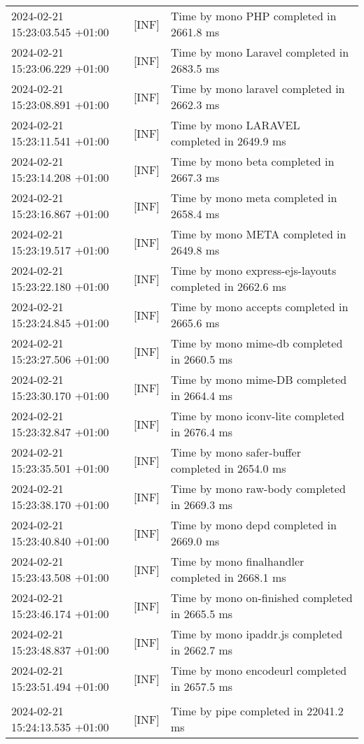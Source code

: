 {{\begin{tabularx}{\textwidth}{|l|l|X|}
                    2024-02-21 15:23:03.545 +01:00 & [INF] & Time by mono PHP completed in 2661.8 ms \\
                    2024-02-21 15:23:06.229 +01:00 & [INF] & Time by mono Laravel completed in 2683.5 ms \\
                    2024-02-21 15:23:08.891 +01:00 & [INF] & Time by mono laravel completed in 2662.3 ms \\
                    2024-02-21 15:23:11.541 +01:00 & [INF] & Time by mono LARAVEL completed in 2649.9 ms \\
                    2024-02-21 15:23:14.208 +01:00 & [INF] & Time by mono beta completed in 2667.3 ms \\
                    2024-02-21 15:23:16.867 +01:00 & [INF] & Time by mono meta completed in 2658.4 ms \\
                    2024-02-21 15:23:19.517 +01:00 & [INF] & Time by mono META completed in 2649.8 ms \\
                    2024-02-21 15:23:22.180 +01:00 & [INF] & Time by mono express-ejs-layouts completed in 2662.6 ms \\
                    2024-02-21 15:23:24.845 +01:00 & [INF] & Time by mono accepts completed in 2665.6 ms \\
                    2024-02-21 15:23:27.506 +01:00 & [INF] & Time by mono mime-db completed in 2660.5 ms \\
                    2024-02-21 15:23:30.170 +01:00 & [INF] & Time by mono mime-DB completed in 2664.4 ms \\
                    2024-02-21 15:23:32.847 +01:00 & [INF] & Time by mono iconv-lite completed in 2676.4 ms \\
                    2024-02-21 15:23:35.501 +01:00 & [INF] & Time by mono safer-buffer completed in 2654.0 ms \\
                    2024-02-21 15:23:38.170 +01:00 & [INF] & Time by mono raw-body completed in 2669.3 ms \\
                    2024-02-21 15:23:40.840 +01:00 & [INF] & Time by mono depd completed in 2669.0 ms \\
                    2024-02-21 15:23:43.508 +01:00 & [INF] & Time by mono finalhandler completed in 2668.1 ms \\
                    2024-02-21 15:23:46.174 +01:00 & [INF] & Time by mono on-finished completed in 2665.5 ms \\
                    2024-02-21 15:23:48.837 +01:00 & [INF] & Time by mono ipaddr.js completed in 2662.7 ms \\
                    2024-02-21 15:23:51.494 +01:00 & [INF] & Time by mono encodeurl completed in 2657.5 ms \\
                    & & \\
                    2024-02-21 15:24:13.535 +01:00 & [INF] & Time by pipe completed in 22041.2 ms \\
                    \hline
                \end{tabularx}
            }
        }

